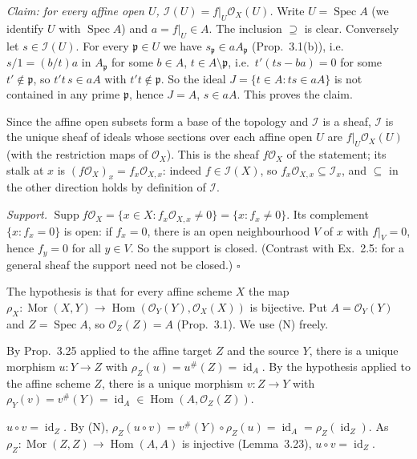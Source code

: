 \documentclass[11pt]{article}
\begin{document}
\emph{Claim: for every affine open $U$, $\mathcal{I}(U)=f|_U\mathcal{O}_X(U)$.} Write $U=\operatorname{Spec}A$ (we identify $U$ with $\operatorname{Spec}A$) and $a=f|_U\in A$. The inclusion $\supseteq$ is clear. Conversely let $s\in\mathcal{I}(U)$. For every $\mathfrak{p}\in U$ we have $s_{\mathfrak{p}}\in aA_{\mathfrak{p}}$ (Prop.~3.1(b)), i.e.\ $s/1=(b/t)a$ in $A_{\mathfrak{p}}$ for some $b\in A$, $t\in A\setminus\mathfrak{p}$, i.e.\ $t'(ts-ba)=0$ for some $t'\notin\mathfrak{p}$, so $t't\,s\in aA$ with $t't\notin\mathfrak{p}$. So the ideal $J=\{t\in A:ts\in aA\}$ is not contained in any prime $\mathfrak{p}$, hence $J=A$, $s\in aA$. This proves the claim.

Since the affine open subsets form a base of the topology and $\mathcal{I}$ is a sheaf, $\mathcal{I}$ is the unique sheaf of ideals whose sections over each affine open $U$ are $f|_U\mathcal{O}_X(U)$ (with the restriction maps of $\mathcal{O}_X$). This is the sheaf $f\mathcal{O}_X$ of the statement; its stalk at $x$ is $(f\mathcal{O}_X)_x=f_x\mathcal{O}_{X,x}$: indeed $f\in\mathcal{I}(X)$, so $f_x\mathcal{O}_{X,x}\subseteq\mathcal{I}_x$, and $\subseteq$ in the other direction holds by definition of $\mathcal{I}$.

\emph{Support.} $\operatorname{Supp}f\mathcal{O}_X=\{x\in X:f_x\mathcal{O}_{X,x}\neq0\}=\{x:f_x\neq0\}$. Its complement $\{x:f_x=0\}$ is open: if $f_x=0$, there is an open neighbourhood $V$ of $x$ with $f|_V=0$, hence $f_y=0$ for all $y\in V$. So the support is closed. (Contrast with Ex.~2.5: for a general sheaf the support need not be closed.) \hfill$\square$

\pf
The hypothesis is that for every affine scheme $X$ the map $\rho_X:\operatorname{Mor}(X,Y)\to\operatorname{Hom}(\mathcal{O}_Y(Y),\mathcal{O}_X(X))$ is bijective. Put $A=\mathcal{O}_Y(Y)$ and $Z=\operatorname{Spec}A$, so $\mathcal{O}_Z(Z)=A$ (Prop.~3.1). We use (N) freely.

By Prop.~3.25 applied to the affine target $Z$ and the source $Y$, there is a unique morphism $u:Y\to Z$ with $\rho_Z(u)=u^{\#}(Z)=\operatorname{id}_A$. By the hypothesis applied to the affine scheme $Z$, there is a unique morphism $v:Z\to Y$ with $\rho_Y(v)=v^{\#}(Y)=\operatorname{id}_A\in\operatorname{Hom}(A,\mathcal{O}_Z(Z))$.

\emph{$u\circ v=\operatorname{id}_Z$.} By (N), $\rho_Z(u\circ v)=v^{\#}(Y)\circ\rho_Z(u)=\operatorname{id}_A=\rho_Z(\operatorname{id}_Z)$. As $\rho_Z:\operatorname{Mor}(Z,Z)\to\operatorname{Hom}(A,A)$ is injective (Lemma~3.23), $u\circ v=\operatorname{id}_Z$.
\end{document}
